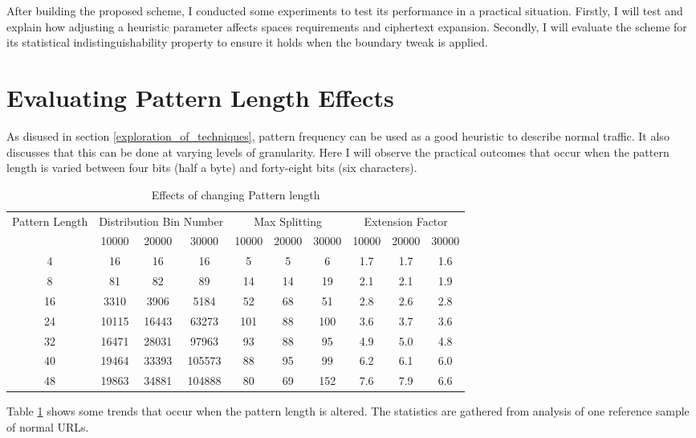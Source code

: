 \documentclass[ %
                    author={Samuel Russell},
                supervisor={Prof. Bogdan Warinschi},
                    degree={MEng},
                     title={Innocuous Ciphertexts},
                  subtitle={The DE-CENSOR Scheme},
                      type={Research},
                      year={2018} ]{dissertation}
\begin{document}
After building the proposed scheme, I conducted some experiments to test its performance in a practical situation.
Firstly, I will test and explain how adjusting a heuristic parameter affects spaces requirements and ciphertext expansion.
Secondly, I will evaluate the scheme for its statistical indistinguishability property to ensure it holds when the boundary tweak is applied.

\section{Evaluating Pattern Length Effects}\label{sec:gran}

As disused in section \ref{exploration_of_techniques}, pattern frequency can be used as a good heuristic to describe normal traffic.
It also discusses that this can be done at varying levels of granularity.
Here I will observe the practical outcomes that occur when the pattern length is varied between four bits (half a byte) and forty-eight bits (six characters).

\begin{table}[h]
\centering
\begin{tabular}{|c|c|c|c|c|c|c|c|c|c|}
\hline
\multirow{2}{*}{Pattern Length}&
\multicolumn{3}{|c|}{Distribution Bin Number}&
\multicolumn{3}{|c|}{Max Splitting}&
\multicolumn{3}{|c|}{Extension Factor}\\
\cline{2-10}
&10000&20000&30000&10000&20000&30000&10000&20000&30000\\
\hline
4 	& 16&16&16 				& 5&5&6 		& 1.7&1.7&1.6\\
8 	& 81&82&89 				& 14&14&19		& 2.1&2.1&1.9\\
16 	& 3310&3906&5184 		& 52&68&51 		& 2.8&2.6&2.8\\
24 	& 10115&16443&63273 	& 101&88&100 	& 3.6&3.7&3.6\\
32 	& 16471&28031&97963 	& 93&88&95 		& 4.9&5.0&4.8\\
40 	& 19464&33393&105573 	& 88&95&99 		& 6.2&6.1&6.0\\
48 	& 19863&34881&104888 	& 80&69&152 	& 7.6&7.9&6.6\\
\hline
\end{tabular}
\caption{Effects of changing Pattern length}
\label{tab:patlen}
\end{table}

Table \ref{tab:patlen} shows some trends that occur when the pattern length is altered. The statistics are gathered from analysis of one reference sample of normal URLs.
\end{document}
